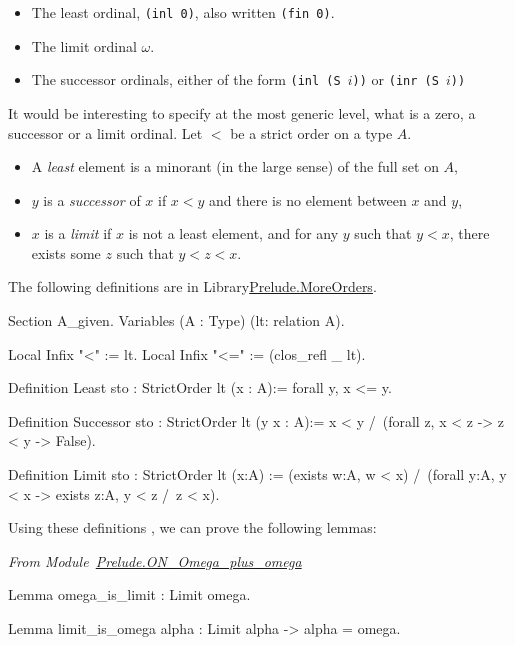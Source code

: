 \begin{itemize}
\item The least ordinal, \texttt{(inl 0)}, also written \texttt{(fin 0)}.
\item The limit ordinal $\omega$.
\item The successor ordinals, either of the form \texttt{(inl (S $i$))} or \texttt{(inr (S $i$))}
\end{itemize}

It would be interesting to specify at the most generic level, what is a zero, a successor or a limit ordinal. Let $<$ be a strict order on a type $A$.

\begin{itemize}
\item A \emph{least} element is a minorant (in the large sense) of the full set  on $A$,
\item $y$ is a \emph{successor} of $x$ if $x<y$ and there is no element between $x$ and $y$,
\item $x$ is a \emph{limit} if $x$ is not a least element, and for any $y$ such that $y<x$,
 there exists some $z$ such that $y<z<x$.
\end{itemize}


The following definitions are in Library\href{../src/html/hydras.Prelude.MoreOrders.html}{Prelude.MoreOrders}.

\begin{Coqsrc}
Section A_given.
  Variables (A : Type)  (lt: relation A).
  
Local Infix "<" := lt.
Local Infix "<=" := (clos_refl _ lt).

Definition Least {sto : StrictOrder lt} (x : A):=
  forall y,  x <= y.

Definition Successor {sto : StrictOrder lt} (y x : A):=
  x < y /\ (forall z,  x < z ->  z <  y -> False).

Definition Limit {sto : StrictOrder lt}  (x:A)  :=
  (exists w:A,  w < x) /\
  (forall y:A, y < x -> exists z:A, y < z /\ z < x).
\end{Coqsrc}

Using these definitions , we can prove the following lemmas:

\vspace{4pt}

\noindent\emph{From Module~\href{../src/html/hydras.Prelude.ON_Omega_plus_omega.html}{Prelude.ON\_Omega\_plus\_omega}}

\begin{Coqsrc}
 Lemma omega_is_limit : Limit omega. 

Lemma limit_is_omega alpha : Limit alpha -> alpha = omega.


\end{Coqsrc}

